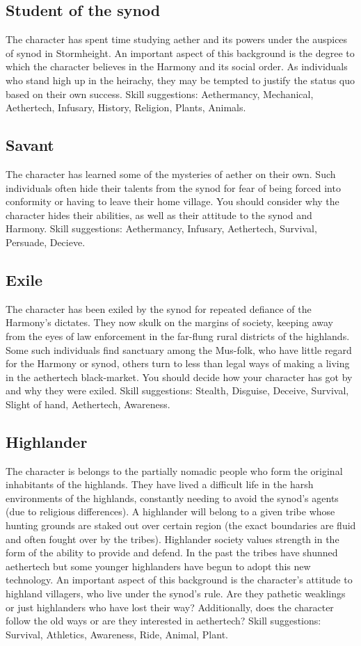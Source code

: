 \documentclass[a4paper,11pt,oneside]{book}
\begin{document}
\subsection{Student of the synod}
The character has spent time studying aether and its powers under the auspices of synod in Stormheight. An important aspect of this background is the degree to which the character believes in the Harmony and its social order. As individuals who stand high up in the heirachy, they may be tempted to justify the status quo based on their own success. Skill suggestions: Aethermancy, Mechanical, Aethertech, Infusary, History, Religion, Plants, Animals.

\subsection{Savant}
The character has learned some of the mysteries of aether on their own. Such individuals often hide their talents from the synod for fear of being forced into conformity or having to leave their home village. You should consider why the character hides their abilities, as well as their attitude to the synod and Harmony. Skill suggestions: Aethermancy, Infusary, Aethertech, Survival, Persuade, Decieve. 

\subsection{Exile}
The character has been exiled by the synod for repeated defiance of the Harmony's dictates. They now skulk on the margins of society, keeping away from the eyes of law enforcement in the far-flung rural districts of the highlands. Some such individuals find sanctuary among the Mus-folk, who have little regard for the Harmony or synod, others turn to less than legal ways of making a living in the aethertech black-market. You should decide how your character has got by and why they were exiled. Skill suggestions: Stealth, Disguise, Deceive, Survival, Slight of hand, Aethertech, Awareness.  

\subsection{Highlander}
The character is belongs to the partially nomadic people who form the original inhabitants of the highlands. They have lived a difficult life in the harsh environments of the highlands, constantly needing to avoid the synod's agents (due to religious differences). A highlander will belong to a given tribe whose hunting grounds are staked out over certain region (the exact boundaries are fluid and often fought over by the tribes). Highlander society values strength in the form of the ability to provide and defend. In the past the tribes have shunned aethertech but some younger highlanders have begun to adopt this new technology. An important aspect of this background is the character's attitude to highland villagers, who live under the synod's rule. Are they pathetic weaklings or just highlanders who have lost their way? Additionally, does the character follow the old ways or are they interested in aethertech? Skill suggestions: Survival, Athletics, Awareness, Ride, Animal, Plant.  
\end{document}

